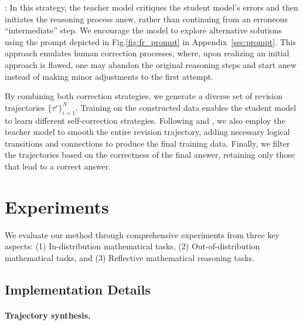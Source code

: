 \documentclass[11pt]{article}
\begin{document}
: In this strategy, the teacher model critiques the student model's errors and then initiates the reasoning process anew, rather than continuing from an erroneous ``intermediate'' step. We encourage the model to explore alternative solutions using the prompt depicted in Fig.\ref{fig:fr_prompt} in Appendix~\ref{sec:prompt}. This approach emulates human correction processes, where, upon realizing an initial approach is flawed, one may abandon the original reasoning steps and start anew instead of making minor adjustments to the first attempt.

By combining both correction strategies, we generate a diverse set of revision trajectories $\{\tau^{r}\}_{i=1}^{N}$. Training on the constructed data enables the student model to learn different self-correction strategies. Following \citet{xi2024enhancing} and \citet{qin2024o1}, we also employ the teacher model to smooth the entire revision trajectory, adding necessary logical transitions and connections to produce the final training data. Finally, we filter the trajectories based on the correctness of the final answer, retaining only those that lead to a correct answer.

\section{Experiments}


We evaluate our method through comprehensive experiments from three key aspects: (1) In-distribution mathematical tasks, (2) Out-of-distribution mathematical tasks, and (3) Reflective mathematical reasoning tasks. 

\subsection{Implementation Details}

\paragraph{Trajectory synthesis.}
\end{document}
